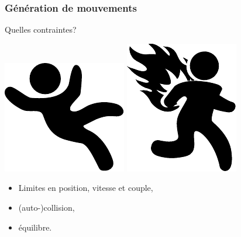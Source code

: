 \documentclass[14pt,utf8,hyperref={pdfpagelabels=false}]{beamer}
\begin{document}

\begin{slideDecision}
  \frametitle{Génération de mouvements}


  \begin{changeleftmargin}{1.1cm}
  \begin{center}
    Quelles contraintes?\par
    \vspace{1cm}
    \includegraphics[width=.25\paperheight]{src/slides/falling.pdf}%
    \includegraphics[width=.25\paperheight]{src/slides/burning.pdf}\par
  \end{center}

  \begin{itemize}
  \item Limites en position, vitesse et couple,
  \item (auto-)collision,
  \item \alert{équilibre}.
  \end{itemize}
  \end{changeleftmargin}
\end{slideDecision}
\end{document}
